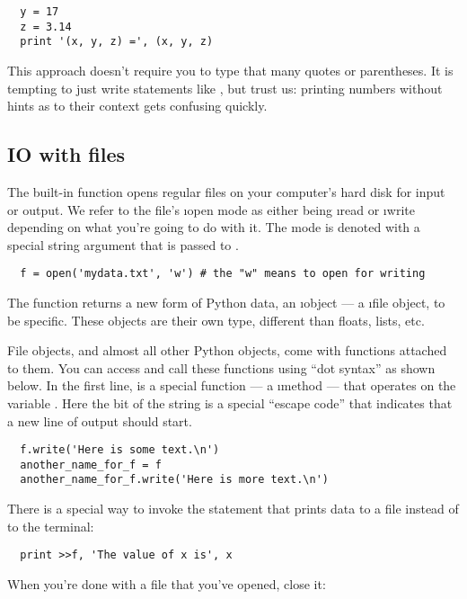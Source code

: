 \documentclass[letterpaper, 12pt, titlepage, twoside]{article}
\begin{document}
\begin{lstlisting}
  y = 17
  z = 3.14
  print '(x, y, z) =', (x, y, z)
\end{lstlisting}

This approach doesn't require you to type that many quotes or parentheses. It
is tempting to just write statements like , but trust us:
printing numbers without hints as to their context gets confusing quickly.

\subsection*{IO with files}

The built-in  function opens regular files on your computer's hard
disk for input or output. We refer to the file's \i{open mode} as either being
\i{read} or \i{write} depending on what you're going to do with it. The mode
is denoted with a special string argument that is passed to .

\begin{lstlisting}
  f = open('mydata.txt', 'w') # the "w" means to open for writing
\end{lstlisting}

The  function returns a new form of Python data, an \i{object} --- a
\i{file object}, to be specific. These objects are their own type, different
than floats, lists, etc.

File objects, and almost all other Python objects, come with functions
attached to them. You can access and call these functions using ``dot syntax''
as shown below. In the first line,  is a special function --- a
\i{method} --- that operates on the variable . Here the
 bit of the string is a special ``escape code'' that
indicates that a new line of output should start.

\begin{lstlisting}
  f.write('Here is some text.\n')
  another_name_for_f = f
  another_name_for_f.write('Here is more text.\n')
\end{lstlisting}

There is a special way to invoke the  statement that prints data to a
file instead of to the terminal:

\begin{lstlisting}
  print >>f, 'The value of x is', x
\end{lstlisting}

When you're done with a file that you've opened, close it:
\end{document}
